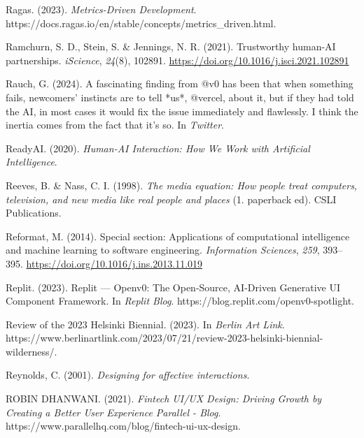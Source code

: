 \documentclass[
  letterpaper,
  DIV=11,
  numbers=noendperiod]{scrartcl}
\newlength{\cslhangindent}
\newenvironment{CSLReferences}[2] %
 {\begin{list}{}{%
  \setlength{\itemindent}{0pt}
  \setlength{\leftmargin}{0pt}
  \setlength{\parsep}{0pt}
  \ifodd #1
   \setlength{\leftmargin}{\cslhangindent}
   \setlength{\itemindent}{-1\cslhangindent}
  \fi
  \setlength{\itemsep}{#2\baselineskip}}}
 {\end{list}}
\begin{document}
\begin{CSLReferences}{1}{0}
Ragas. (2023). \emph{Metrics-{Driven Development}}.
https://docs.ragas.io/en/stable/concepts/metrics\_driven.html.

Ramchurn, S. D., Stein, S. \& Jennings, N. R. (2021). Trustworthy
human-{AI} partnerships. \emph{iScience}, \emph{24}(8), 102891.
\url{https://doi.org/10.1016/j.isci.2021.102891}

Rauch, G. (2024). A fascinating finding from @v0 has been that when
something fails, newcomers' instincts are to tell *us*, @vercel, about
it, but if they had told the {AI}, in most cases it would fix the issue
immediately and flawlessly. {I} think the inertia comes from the fact
that it's so. In \emph{Twitter}.

ReadyAI. (2020). \emph{Human-{AI Interaction}: {How We Work} with
{Artificial Intelligence}}.

Reeves, B. \& Nass, C. I. (1998). \emph{The media equation: How people
treat computers, television, and new media like real people and places}
(1. paperback ed). CSLI Publications.

Reformat, M. (2014). Special section: {Applications} of computational
intelligence and machine learning to software engineering.
\emph{Information Sciences}, \emph{259}, 393--395.
\url{https://doi.org/10.1016/j.ins.2013.11.019}

Replit. (2023). Replit --- {Openv0}: {The Open-Source}, {AI-Driven
Generative UI Component Framework}. In \emph{Replit Blog}.
https://blog.replit.com/openv0-spotlight.

Review of the 2023 {Helsinki Biennial}. (2023). In \emph{Berlin Art
Link}.
https://www.berlinartlink.com/2023/07/21/review-2023-helsinki-biennial-wilderness/.

Reynolds, C. (2001). \emph{Designing for affective interactions}.

ROBIN DHANWANI. (2021). \emph{Fintech {UI}/{UX Design}: {Driving Growth}
by {Creating} a {Better User Experience} {\textbar} {Parallel} -
{Blog}}. https://www.parallelhq.com/blog/fintech-ui-ux-design.


\end{CSLReferences}
\end{document}
